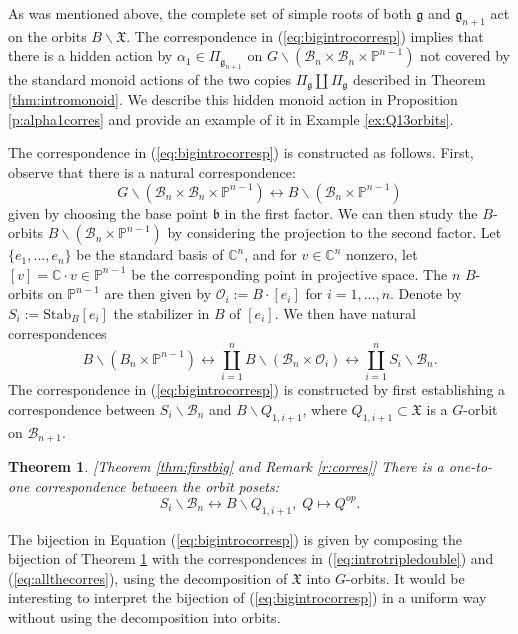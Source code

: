\documentclass[12pt]{amsart}
\numberwithin{equation}{section}
\newtheorem{thm}{Theorem}[section]
\newcommand{\fg}{\mbox{${\mathfrak g}$}}
\newcommand{\fb}{\mbox{${\mathfrak b}$}}
\newcommand{\C}{\mbox{${\mathbb C}$}}
\newcommand{\B}{\mathcal{B}}
\begin{document}
As was mentioned above, the complete set of simple roots of both $\fg$ and $\fg_{n+1}$ act on the orbits $B\backslash\mathfrak{X}$.  The correspondence in (\ref{eq:bigintrocorresp}) implies that there is a hidden action by $\alpha_{1}\in \Pi_{\fg_{n+1}}$ on $G\backslash (\B_{n}\times \B_{n}\times\mathbb{P}^{n-1})$ not covered by the standard monoid actions of the two copies $\Pi_{\fg}\coprod\Pi_{\fg}$ described in Theorem \ref{thm:intromonoid}.  We describe this hidden monoid action in Proposition \ref{p:alpha1corres} and provide an example of it in Example \ref{ex:Q13orbits}.  

The correspondence in (\ref{eq:bigintrocorresp}) is constructed
as follows.  First, observe that there is a natural correspondence:
\begin{equation} \label{eq:introtripledouble}
G\backslash(\B_{n}\times\B_{n}\times\mathbb{P}^{n-1}) \longleftrightarrow B\backslash (\B_{n}\times\mathbb{P}^{n-1})
\end{equation}
given by choosing the base point $\fb$ in the first factor. 
We can then study the $B$-orbits $B\backslash (\B_{n}\times\mathbb{P}^{n-1})$ by considering the projection to the second factor.  
Let $\{e_{1},\dots,  e_{n}\}$ be the standard basis of $\C^{n}$, and for $v\in \C^n$ nonzero, let $[v]=\C \cdot  v\in\mathbb{P}^{n-1}$ be the corresponding point in projective space.  The $n$ $B$-orbits on $\mathbb{P}^{n-1}$ are then given by $\mathcal{O}_{i}:=B\cdot[e_{i}]$ for $i=1,\dots, n$.  Denote by $S_{i}:=\mbox{Stab}_{B}[e_{i}]$ the stabilizer in $B$ of $[e_{i}]$.  We then have natural correspondences
\begin{equation}\label{eq:allthecorres}
B\backslash(B_{n}\times\mathbb{P}^{n-1})\longleftrightarrow\coprod_{i=1}^{n} B\backslash (\B_{n}\times\mathcal{O}_{i}) \longleftrightarrow \coprod_{i=1}^{n} S_{i}\backslash\B_{n}.
\end{equation}
The correspondence in (\ref{eq:bigintrocorresp}) is constructed by first establishing a correspondence between $S_{i}\backslash\B_{n}$ and $B\backslash Q_{1,i+1}$, where $Q_{1,i+1}\subset \mathfrak{X}$ is a $G$-orbit on $\B_{n+1}$.

\begin{thm}\label{thm:introlocalcorres}\emph{[Theorem \ref{thm:firstbig} and Remark \ref{r:corres}]}
There is a one-to-one correspondence between the orbit posets:
$$
S_{i}\backslash\B_{n}\longleftrightarrow B\backslash Q_{1,i+1}, \; Q\mapsto Q^{op}.
$$
\end{thm}
 The bijection in Equation (\ref{eq:bigintrocorresp}) is given by composing the bijection of Theorem \ref{thm:introlocalcorres} with the correspondences in (\ref{eq:introtripledouble}) and (\ref{eq:allthecorres}), using the decomposition of $\mathfrak{X}$ into $G$-orbits.   It would be interesting to interpret the bijection of (\ref{eq:bigintrocorresp}) in a uniform way without using the decomposition into orbits.
 
\end{document}
